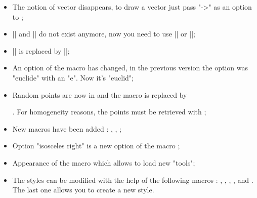 \begin{itemize}
\item  The notion of vector disappears, to draw a vector just pass "->" as an option to ;


\item |\tkzDefIntSimilitudeCenter| and |\tkzDefExtSimilitudeCenter|  do not exist anymore, now you need to use  |\tkzDefSimilitudeCenter[int]| or |\tkzDefSimilitudeCenter[ext]|;
  
\item |\tkzDefRandPointOn| is replaced by |\tkzGetRandPointOn|;


\item An option of the macro  has changed, in the previous version the option was "euclide" with an "e". Now it's "euclid";

\item Random points are now in \tkzname{\tkznameofpack} and the macro  is replaced by

 . For homogeneity reasons, the points must be retrieved with ;

\item New macros have been added : , , ;


\item Option "isosceles right" is a new option of the macro ;

\item Appearance of the macro  which allows to load new "tools";

\item The styles can be modified with the help of the following macros : , , , ,  and . The last one allows you to create a new style.
\end{itemize}

\endinput
